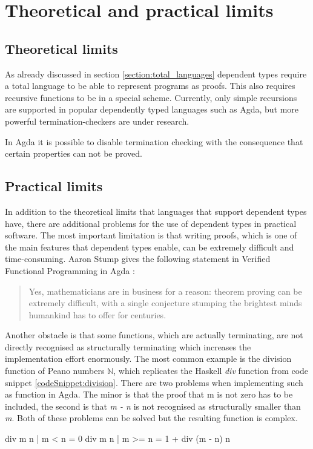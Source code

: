 \section{Theoretical and practical limits}
\subsection{Theoretical limits}
As already discussed in section \ref{section:total_languages} dependent types require a total language to be able to represent programs as proofs.
This also requires recursive functions to be in a special scheme.
Currently, only simple recursions are supported in popular dependently typed languages such as Agda, but more powerful termination-checkers are under research.

In Agda it is possible to disable termination checking with the consequence that certain properties can not be proved.
\subsection{Practical limits}
In addition to the theoretical limits that languages that support dependent types have, there are additional problems for the use of dependent types in practical software.
The most important limitation is that writing proofs, which is one of the main features that dependent types enable, can be extremely difficult and time-consuming.
Aaron Stump gives the following statement in Verified Functional Programming in Agda \cite{10.1145/2841316}:
\begin{quote}
Yes, mathematicians are in business for a reason: theorem proving can be extremely difficult, with a single conjecture stumping the brightest minds humankind has to offer for centuries.
\end{quote}

Another obstacle is that some functions, which are actually terminating, are not directly recognised as structurally terminating which increases the implementation effort enormously.
The most common example is the division function of Peano numbers $\mathbb{N}$, which replicates the Haskell \emph{div} function from code snippet \ref{codeSnippet:division}.
There are two problems when implementing such as function in Agda. The minor is that the proof that m is not zero has to be included, the second is that \emph{m - n} is not recognised as structurally smaller than \emph{m}. Both of these problems can be solved but the resulting function is complex.
\begin{codesnippet}[mathescape=true, caption={Definition of div function in Haskell}, label={codeSnippet:division}]
div m n | m < n = 0
div m n | m >= n = 1 + div (m - n) n
\end{codesnippet}

